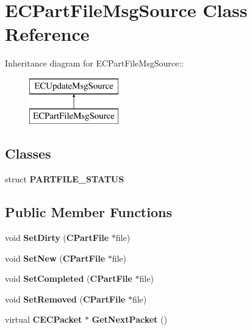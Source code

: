 \section{ECPartFileMsgSource Class Reference}
\label{classECPartFileMsgSource}
Inheritance diagram for ECPartFileMsgSource::\begin{figure}[H]
\begin{center}
\leavevmode
\includegraphics[height=2cm]{classECPartFileMsgSource}
\end{center}
\end{figure}
\subsection*{Classes}
\begin{DoxyCompactItemize}
\item 
struct {\bf PARTFILE\_\-STATUS}
\end{DoxyCompactItemize}
\subsection*{Public Member Functions}
\begin{DoxyCompactItemize}
\item 
void {\bfseries SetDirty} ({\bf CPartFile} $\ast$file)\label{classECPartFileMsgSource_af793348213ab29dec2ca3f0dd1f418fa}

\item 
void {\bfseries SetNew} ({\bf CPartFile} $\ast$file)\label{classECPartFileMsgSource_a2118be5dac39d17336a0f80163a01ce2}

\item 
void {\bfseries SetCompleted} ({\bf CPartFile} $\ast$file)\label{classECPartFileMsgSource_a7280772bdc66a7cefebc7672a713ebd5}

\item 
void {\bfseries SetRemoved} ({\bf CPartFile} $\ast$file)\label{classECPartFileMsgSource_a60807eb741d8387d23e8efa6b349df27}

\item 
virtual {\bf CECPacket} $\ast$ {\bfseries GetNextPacket} ()\label{classECPartFileMsgSource_aded2303bb415a5d99c7b701e2a2f1bb5}

\end{DoxyCompactItemize}
